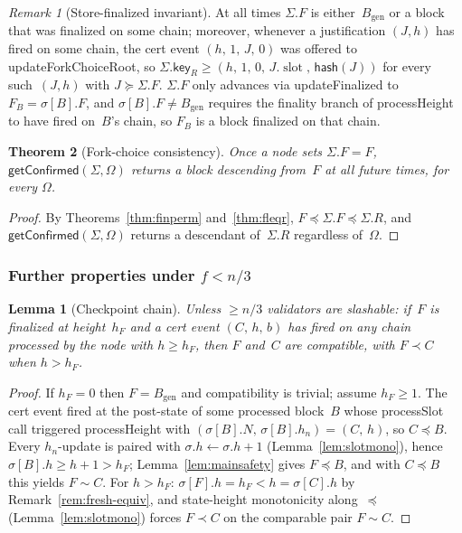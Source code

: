 \ifx\litemode\undefined\documentclass{article}\fi
\newcommand{\genesis}{\ensuremath{B_{\mathrm{gen}}}}
\newcommand{\slot}[0]{\ensuremath{\operatorname{\mathrm{slot}}}}
\newcommand{\hash}{\mathsf{hash}}
\newcommand{\key}{\mathsf{key}}
\newcommand{\processSlot}{\textsf{processSlot}\xspace}
\newcommand{\processHeight}{\textsf{processHeight}\xspace}
\newcommand{\updateForkChoiceRoot}{\textsf{updateForkChoiceRoot}\xspace}
\newcommand{\updateFinalized}{\textsf{updateFinalized}\xspace}
\newcommand{\getConfirmed}{\textsf{getConfirmed}\xspace}
\theoremstyle{plain}
\newtheorem{theorem}{Theorem}
\newtheorem{lemma}{Lemma}
\theoremstyle{definition}
\theoremstyle{remark}
\newtheorem{remark}[theorem]{Remark}
\begin{document}
\begin{remark}[Store-finalized invariant]\label{rem:fs-invariant}
At all times $\Sigma.F$ is either~$\genesis$ or a block that was finalized on some chain; moreover, whenever a justification $(J, h)$ has fired on some chain, the cert event $(h,\, 1,\, J,\, 0)$ was offered to \updateForkChoiceRoot, so $\Sigma.\key_R \geq (h,\, 1,\, 0,\, J.\slot,\, \hash(J))$ for every such~$(J, h)$ with $J \succeq \Sigma.F$.
$\Sigma.F$ only advances via \updateFinalized to $F_B = \sigma[B].F$, and $\sigma[B].F \neq \genesis$ requires the finality branch of \processHeight to have fired on~$B$'s chain, so $F_B$ is a block finalized on that chain.
\end{remark}

\begin{theorem}[Fork-choice consistency]\label{thm:fcconsistency}
Once a node sets $\Sigma.F = F$, $\getConfirmed(\Sigma, \Omega)$ returns a block descending from~$F$ at all future times, for every $\Omega$.
\end{theorem}

\begin{proof}
By Theorems~\ref{thm:finperm} and~\ref{thm:fleqr}, $F \preceq \Sigma.F \preceq \Sigma.R$, and $\getConfirmed(\Sigma, \Omega)$ returns a descendant of~$\Sigma.R$ regardless of~$\Omega$.
\end{proof}

\subsubsection*{Further properties under $f < n/3$}

\begin{lemma}[Checkpoint chain]\label{lem:certchain}
Unless $\geq n/3$ validators are slashable: if~$F$ is finalized at height~$h_F$ and a cert event $(C,\, h,\, b)$ has fired on any chain processed by the node with $h \geq h_F$, then $F$ and~$C$ are compatible, with $F \prec C$ when $h > h_F$.
\end{lemma}

\begin{proof}
If $h_F = 0$ then $F = \genesis$ and compatibility is trivial; assume $h_F \geq 1$.
The cert event fired at the post-state of some processed block~$B$ whose \processSlot call triggered \processHeight with $(\sigma[B].N,\, \sigma[B].h_n) = (C,\, h)$, so $C \preceq B$.
Every $h_n$-update is paired with $\sigma.h \gets \sigma.h + 1$ (Lemma~\ref{lem:slotmono}), hence $\sigma[B].h \geq h + 1 > h_F$; Lemma~\ref{lem:mainsafety} gives $F \preceq B$, and with $C \preceq B$ this yields $F \sim C$.
For $h > h_F$: $\sigma[F].h = h_F < h = \sigma[C].h$ by Remark~\ref{rem:fresh-equiv}, and state-height monotonicity along~$\preceq$ (Lemma~\ref{lem:slotmono}) forces $F \prec C$ on the comparable pair $F \sim C$.
\end{proof}
\end{document}

